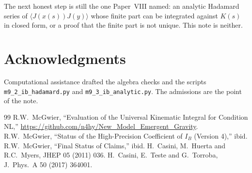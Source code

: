 \documentclass[11pt]{article}
\theoremstyle{definition}
\newcommand{\IB}{I_B}
\begin{document}
The next honest step is still the one Paper~VIII named: an analytic
Hadamard series of $\langle J(x(s))J(y)\rangle$ whose finite part can
be integrated against $K(s)$ in closed form, or a proof that the
finite part is not unique. This note is neither.

\section*{Acknowledgments}
Computational assistance drafted the algebra checks and the scripts
\texttt{m9\_2\_ib\_hadamard.py} and \texttt{m9\_3\_ib\_analytic.py}.
The admissions are the point of the note.

\begin{thebibliography}{99}
 R.W.~McGwier, ``Evaluation of the Universal Kinematic Integral for Condition NL,''
\url{https://github.com/n4hy/New_Model_Emergent_Gravity}.
 R.W.~McGwier, ``Status of the High-Precision Coefficient of $\IB$ (Version 4),'' ibid.
 R.W.~McGwier, ``Final Status of Claims,'' ibid.
 H.~Casini, M.~Huerta and R.C.~Myers, JHEP 05 (2011) 036.
 H.~Casini, E.~Teste and G.~Torroba, J.\ Phys.\ A 50 (2017) 364001.
\end{thebibliography}
\end{document}
